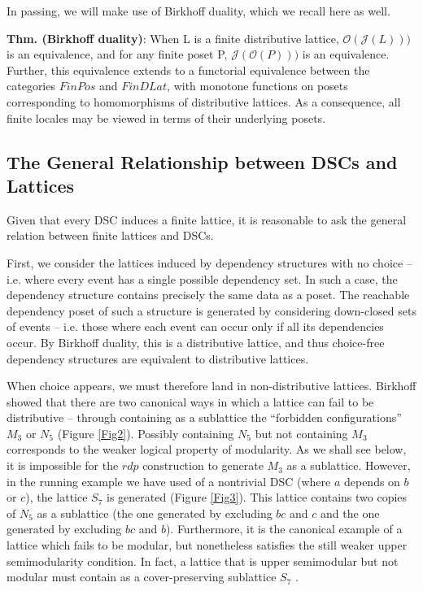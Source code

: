 \documentclass[a4paper,USenglish,cleveref, autoref, thm-restate,authorcolumns]{lipics-v2019}
\newcommand{\Oc}{\mathcal{O}}
\newcommand{\Jc}{\mathcal{J}}
\begin{document}
In passing, we will make use of Birkhoff duality, which we recall here as well.

\textbf{Thm. (Birkhoff duality)}: When L is a finite distributive lattice, \(\Oc(\Jc(L)))\) is an equivalence, and for any finite poset P,  \(\Jc(\Oc(P)))\) is an equivalence. Further, this equivalence extends to a functorial equivalence between the categories \(FinPos\) and \(FinDLat\), with monotone functions on posets corresponding to homomorphisms of distributive lattices. As a consequence, all finite locales may be viewed in terms of their underlying posets.


\subsection{The General Relationship between DSCs and Lattices}
Given that every DSC induces a finite lattice, it is reasonable to ask the general relation between finite lattices and DSCs. 

First, we consider the lattices induced by dependency structures with no choice -- i.e. where every event has a single possible dependency set. In such a case, the dependency structure contains precisely the same data as a poset. The reachable dependency poset of such a structure is generated by considering down-closed sets of events -- i.e. those where each event can occur only if all its dependencies occur. By Birkhoff duality, this is a distributive lattice, and thus choice-free dependency structures are equivalent to distributive lattices.

When choice appears, we must therefore land in non-distributive lattices. Birkhoff showed that there are two canonical ways in which a lattice can fail to be distributive -- through containing as a sublattice the ``forbidden configurations'' \(M_3\) or \(N_5\) (Figure \ref{Fig2}). Possibly containing \(N_5\) but not containing \(M_3\) corresponds to the weaker logical property of modularity. As we shall see below, it is impossible for the \(rdp\) construction to generate \(M_3\) as a sublattice. However, in the running example we have used of a nontrivial DSC (where \(a\) depends on \(b\) or \(c\)), the lattice \(S_7\) is generated (Figure \ref{Fig3}). This lattice contains two copies of \(N_5\) as a sublattice (the one generated by excluding \(bc\) and \(c\) and the one generated by excluding \(bc\) and \(b\)). Furthermore, it is the canonical example of a lattice which fails to be modular, but nonetheless satisfies the still weaker upper semimodularity condition. In fact, a lattice that is upper semimodular but not modular must contain as a cover-preserving sublattice \(S_7\)  \cite{stern1999semimodular}. 
\end{document}
